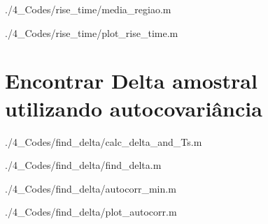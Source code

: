 \begin{apendicesenv}

	{./4_Codes/rise_time/media_regiao.m}
	\begin{center}
	\end{center}


	{./4_Codes/rise_time/plot_rise_time.m}
	\begin{center}
	\end{center}

\section{Encontrar Delta amostral utilizando autocovariância}
\label{sec:tclabsp_find_delta}


	{./4_Codes/find_delta/calc_delta_and_Ts.m}
	\begin{center}
	\end{center}


	{./4_Codes/find_delta/find_delta.m}
	\begin{center}
	\end{center}


	{./4_Codes/find_delta/autocorr_min.m}
	\begin{center}
	\end{center}


	{./4_Codes/find_delta/plot_autocorr.m}
	\begin{center}
	\end{center}


\end{apendicesenv}
